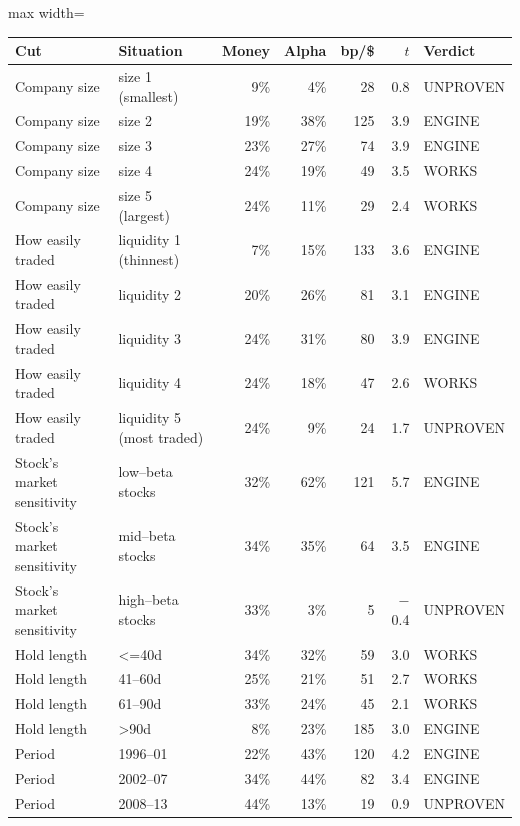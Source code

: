 {\footnotesize
\begin{adjustbox}{max width=\linewidth}
\begin{tabular}{llrrrrl}
\toprule
Cut & Situation & Money & Alpha & bp/\$ & $t$ & Verdict \\
\midrule
Company size & size 1 (smallest) & 9\% & 4\% & 28 & 0.8 & UNPROVEN \\
Company size & size 2 & 19\% & 38\% & 125 & 3.9 & ENGINE \\
Company size & size 3 & 23\% & 27\% & 74 & 3.9 & ENGINE \\
Company size & size 4 & 24\% & 19\% & 49 & 3.5 & WORKS \\
Company size & size 5 (largest) & 24\% & 11\% & 29 & 2.4 & WORKS \\
\midrule
How easily traded & liquidity 1 (thinnest) & 7\% & 15\% & 133 & 3.6 & ENGINE \\
How easily traded & liquidity 2 & 20\% & 26\% & 81 & 3.1 & ENGINE \\
How easily traded & liquidity 3 & 24\% & 31\% & 80 & 3.9 & ENGINE \\
How easily traded & liquidity 4 & 24\% & 18\% & 47 & 2.6 & WORKS \\
How easily traded & liquidity 5 (most traded) & 24\% & 9\% & 24 & 1.7 & UNPROVEN \\
\midrule
Stock's market sensitivity & low--beta stocks & 32\% & 62\% & 121 & 5.7 & ENGINE \\
Stock's market sensitivity & mid--beta stocks & 34\% & 35\% & 64 & 3.5 & ENGINE \\
Stock's market sensitivity & high--beta stocks & 33\% & 3\% & 5 & $-$0.4 & UNPROVEN \\
\midrule
Hold length & <=40d & 34\% & 32\% & 59 & 3.0 & WORKS \\
Hold length & 41--60d & 25\% & 21\% & 51 & 2.7 & WORKS \\
Hold length & 61--90d & 33\% & 24\% & 45 & 2.1 & WORKS \\
Hold length & >90d & 8\% & 23\% & 185 & 3.0 & ENGINE \\
\midrule
Period & 1996--01 & 22\% & 43\% & 120 & 4.2 & ENGINE \\
Period & 2002--07 & 34\% & 44\% & 82 & 3.4 & ENGINE \\
Period & 2008--13 & 44\% & 13\% & 19 & 0.9 & UNPROVEN \\
\bottomrule
\end{tabular}
\end{adjustbox}
}
